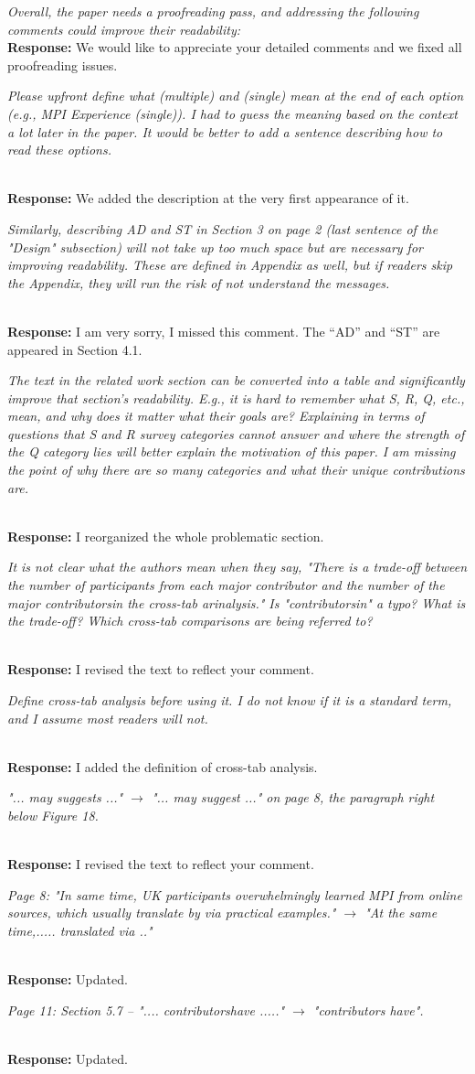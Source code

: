 \documentclass[11pt]{article}
\newcommand{\response}[2]{{\vspace{5mm}\noindent{\bf Comment:} \em #1}\\%
  {\bf Response:} #2}
\newcommand{\iresponse}[2]{{\item \em #1}\\%
  {\bf Response:} #2}
\begin{document}
\response{
Overall, the paper needs a proofreading pass, and addressing the
following comments could improve their readability:
}
{We would like to appreciate your detailed comments and we fixed all
  proofreading issues.}


\begin{enumerate}
\iresponse{Please upfront define what (multiple) and (single) mean at the end
of each option (e.g., MPI Experience (single)). I had to guess the
meaning based on the context a lot later in the paper. It would be
better to add a sentence describing how to read these
options.}
          {We added the description at the very first appearance of it.}
  
\iresponse{Similarly, describing AD and ST in Section 3 on page 2 (last
sentence of the "Design" subsection) will not take up too much space
but are necessary for improving readability. These are defined in
Appendix as well, but if readers skip the Appendix, they will run the
risk of not understand the messages.}
{I am very sorry, I missed this comment. The ``AD'' and ``ST'' are
  appeared in Section 4.1.}

\iresponse{The text in the related work section can be converted into a table
and significantly improve that section's readability. E.g., it is hard
to remember what S, R, Q, etc., mean, and why does it matter what
their goals are? Explaining in terms of questions that S and R survey
categories cannot answer and where the strength of the Q category lies
will better explain the motivation of this paper. I am missing the
point of why there are so many categories and what their unique
contributions are.}
{I reorganized the whole problematic section.}

\iresponse{It is not clear what the authors mean when they say, "There is a
trade-off between the number of participants from each major
contributor and the number of the major contributorsin the cross-tab
arinalysis." Is "contributorsin" a typo? What is the trade-off? Which
cross-tab comparisons are being referred to? }
{I revised the text to reflect your comment.}

\iresponse{Define cross-tab analysis before using it. I do not know if it is a
standard term, and I assume most readers will not.}
{I added the definition of cross-tab analysis.}

\iresponse{"... may suggests ..." $\to$ "... may suggest ..." on page 8, the
  paragraph right below Figure 18.}
{I revised the text to reflect your comment.}

\iresponse{Page 8: "In same time, UK participants overwhelmingly learned MPI
from online sources, which usually translate by via practical
examples." $\to$ "At the same time,..... translated via .."}
{Updated.}

\iresponse{Page 11: Section 5.7 -- ".... contributorshave ....." $\to$
  "contributors have".}
{Updated.}

\end{enumerate}
\end{document}
